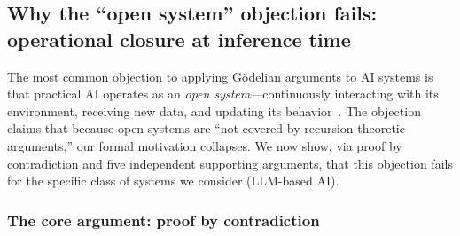 \documentclass[11pt]{article}
\begin{document}

\subsection{Why the ``open system'' objection fails: operational closure at inference time}
\label{app:open-system}

The most common objection to applying G\"{o}delian arguments to AI systems is
that practical AI operates as an \textit{open system}---continuously interacting
with its environment, receiving new data, and updating its
behavior~\citep{eriksson2025trust}. The objection claims that because open systems
are ``not covered by recursion-theoretic arguments,'' our formal motivation
collapses. We now show, via proof by contradiction and five independent
supporting arguments, that this objection fails for the specific class of
systems we consider (LLM-based AI).

\subsubsection{The core argument: proof by contradiction}
\end{document}
